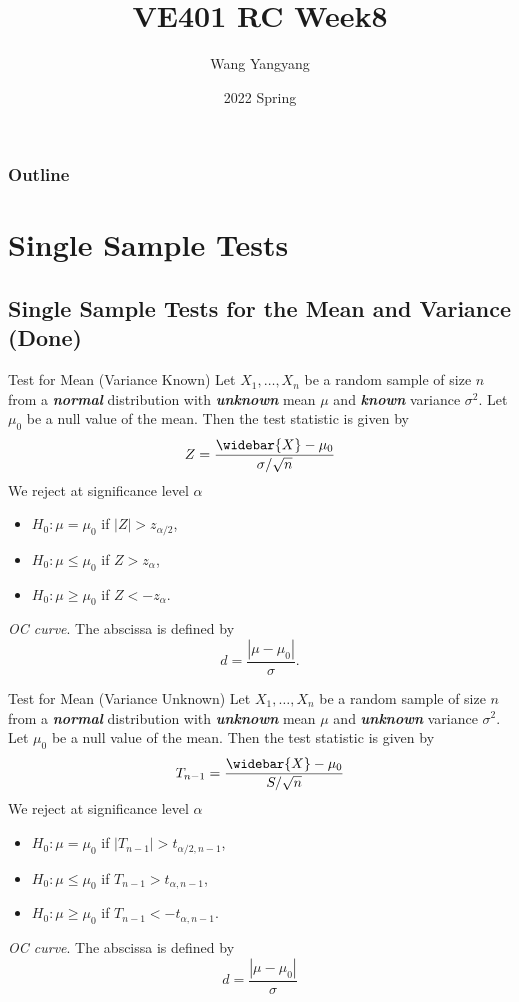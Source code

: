 \documentclass{beamer}
\title{VE401 RC Week8}
\author{Wang Yangyang}
\date{2022 Spring}
\institute{UM-SJTU JI}
\newcommand{\bb}[1]{\textcolor{antiquefuchsia}{\textbf{\textit{#1}}}}
\begin{document}
\maketitle

\begin{frame}
\frametitle{Outline}
\tableofcontents
\end{frame}



\section{Single Sample Tests}
\subsection{Single Sample Tests for the Mean and Variance (Done)}
\begin{frame}{Test for Mean (Variance Known)}
Let $X_{1}, \ldots, X_{n}$ be a random sample of size $n$ from a \bb{normal} distribution with \bb{unknown} mean $\mu$ and \bb{known} variance $\sigma^{2}$. Let $\mu_{0}$ be a null value of the mean. Then the test statistic is given by
$$
Z=\frac{\widebar{X}-\mu_{0}}{\sigma / \sqrt{n}}
$$
We reject at significance level $\alpha$
\begin{itemize}
\item $H_{0}: \mu=\mu_{0}$ if $|Z|>z_{\alpha / 2}$,
\item $H_{0}: \mu \leq \mu_{0}$ if $Z>z_{\alpha}$,
\item $H_{0}: \mu \geq \mu_{0}$ if $Z<-z_{\alpha}$.
\end{itemize}
\textit{OC curve}. The abscissa is defined by
$$
d=\frac{\left|\mu-\mu_{0}\right|}{\sigma} .
$$
\end{frame}


\begin{frame}{Test for Mean (Variance Unknown)}
Let $X_{1}, \ldots, X_{n}$ be a random sample of size $n$ from a \bb{normal} distribution with \bb{unknown} mean $\mu$ and \bb{unknown} variance $\sigma^{2}$. Let $\mu_{0}$ be a null value of the mean. Then the test statistic is given by
$$
T_{n-1}=\frac{\widebar{X}-\mu_{0}}{S / \sqrt{n}}
$$
We reject at significance level $\alpha$
\begin{itemize}
\item $H_{0}: \mu=\mu_{0}$ if $\left|T_{n-1}\right|>t_{\alpha / 2, n-1}$,
\item $H_{0}: \mu \leq \mu_{0}$ if $T_{n-1}>t_{\alpha, n-1}$,
\item $H_{0}: \mu \geq \mu_{0}$ if $T_{n-1}<-t_{\alpha, n-1}$.
\end{itemize}
\textit{OC curve}. The abscissa is defined by
$$
d=\frac{\left|\mu-\mu_{0}\right|}{\sigma}
$$
\end{frame}
\end{document}
